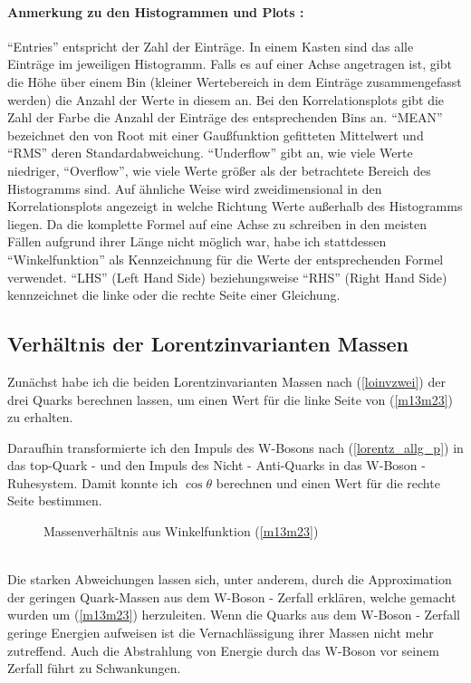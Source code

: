\documentclass[
a4paper,                                %
twoside,                                %
BCOR1.4cm,                      %
ngerman,                                %
10pt,                           %
headings=normal,                %
headsepline,                    %
clearplainpage, %
final,                                  %
div=14,
parskip=full
]{scrbook}
\begin{document}
\paragraph{Anmerkung zu den Histogrammen und Plots :}

"`Entries"' entspricht der Zahl der Eintr\"age. In einem Kasten sind das alle Eintr\"age im jeweiligen Histogramm. Falls es auf einer Achse angetragen ist, gibt die H\"ohe \"uber einem Bin (kleiner Wertebereich in dem Eintr\"age zusammengefasst werden) die Anzahl der Werte in diesem an. Bei den Korrelationsplots gibt die Zahl der Farbe die Anzahl der Eintr\"age des entsprechenden Bins an. "`MEAN"' bezeichnet den von Root mit einer Gau\ss funktion gefitteten Mittelwert und "`RMS"' deren Standardabweichung. "`Underflow"' gibt an, wie viele Werte niedriger, "`Overflow"', wie viele Werte gr\"o\ss er als der betrachtete Bereich des Histogramms sind. Auf \"ahnliche Weise wird zweidimensional in den Korrelationsplots angezeigt in welche Richtung Werte au\ss erhalb des Histogramms liegen. Da die komplette Formel auf eine Achse zu schreiben in den meisten F\"allen aufgrund ihrer L\"ange nicht m\"oglich war, habe ich stattdessen "`Winkelfunktion"' als Kennzeichnung f\"ur die Werte der entsprechenden Formel verwendet. "`LHS"' (Left Hand Side) beziehungsweise "`RHS"' (Right Hand Side) kennzeichnet die linke oder die rechte Seite einer Gleichung.

\newpage

\subsection{Verh\"altnis der Lorentzinvarianten Massen}

Zun\"achst habe ich die beiden Lorentzinvarianten Massen nach (\ref{loinvzwei}) der drei Quarks berechnen lassen, um einen Wert f\"ur die linke Seite von (\ref{m13m23}) zu erhalten.

Daraufhin transformierte ich den Impuls des W-Bosons nach (\ref{lorentz_allg_p}) in das top-Quark -  und den Impuls des Nicht - Anti-Quarks in das W-Boson - Ruhesystem. Damit konnte ich $ \cos \theta $ berechnen und einen Wert f\"ur die rechte Seite bestimmen.%
\\
\begin{figure}[h]
    \caption{Massenverh\"altnis aus Winkelfunktion (\ref{m13m23})}
\end{figure}
\\
Die starken Abweichungen lassen sich, unter anderem, durch die Approximation der geringen Quark-Massen aus dem W-Boson - Zerfall erkl\"aren, welche gemacht wurden um (\ref{m13m23}) herzuleiten. Wenn die Quarks aus dem W-Boson - Zerfall geringe Energien aufweisen ist die Vernachl\"assigung ihrer Massen nicht mehr zutreffend. Auch die Abstrahlung von Energie durch das W-Boson vor seinem Zerfall f\"uhrt zu Schwankungen.
\end{document}
